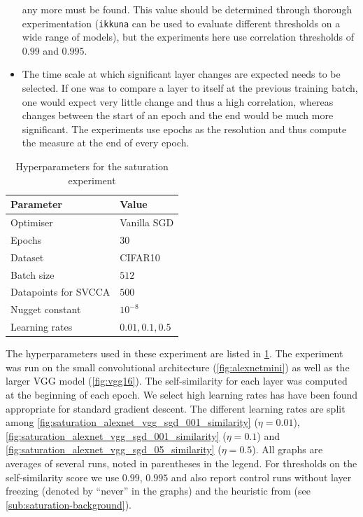 \begin{itemize}
        any more must be found. This value should be determined through thorough
        experimentation (\texttt{ikkuna} can be used to evaluate different
        thresholds on a wide range of models), but the experiments here use
        correlation thresholds of $0.99$ and $0.995$.
    \item The time scale at which significant layer changes are expected needs
        to be selected. If one was to compare a layer to itself at the previous
        training batch, one would expect very little change and thus a high
        correlation, whereas changes between the start of an epoch and the end
        would be much more significant. The experiments use epochs as the
        resolution and thus compute the measure at the end of every epoch.
\end{itemize}
\begin{table}
    \centering
    \caption{Hyperparameters for the saturation experiment}
    \label{tbl:params-saturation}
    \begin{tabular}{ll}
        Parameter            & Value \\\hline\hline
        Optimiser            & Vanilla SGD \\\hline
        Epochs               & $30$ \\\hline
        Dataset              & CIFAR10 \\\hline
        Batch size           & $512$ \\\hline
        Datapoints for SVCCA & $500$ \\\hline
        Nugget constant      & $10^{-8}$ \\\hline
        Learning rates       & $0.01, 0.1, 0.5$
    \end{tabular}
\end{table}

The hyperparameters used in these experiment are listed in
\cref{tbl:params-saturation}.  The experiment was run on the small convolutional
architecture (\cref{fig:alexnetmini}) as well as the larger VGG model
(\cref{fig:vgg16}). The self-similarity for each layer was computed at the
beginning of each epoch. We select high learning rates has have been found
appropriate for standard gradient descent. The different learning rates are
split among \cref{fig:saturation_alexnet_vgg_sgd_001_similarity} ($\eta = 0.01$),
\cref{fig:saturation_alexnet_vgg_sgd_001_similarity} ($\eta = 0.1$) and
\cref{fig:saturation_alexnet_vgg_sgd_05_similarity} ($\eta = 0.5$). All graphs are averages
of several runs, noted in parentheses in the legend. For thresholds on the
self-similarity score we use $0.99$, $0.995$ and also report control runs
without layer freezing (denoted by ``never'' in the graphs) and the heuristic
from \citep{raghu2017svcca} (see \cref{sub:saturation-background}).

